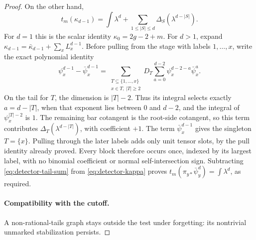\begin{proof}
On the other hand,
\begin{equation}
 t_m(\kappa_{d-1})
 =
 \int\lambda^d+
 \sum_{1\leq |S|\leq d}\Delta_S(\lambda^{d-|S|}).
 \label{eq:detector-kappa}
\end{equation}
For \(d=1\) this is the scalar identity
\(\kappa_0=2g-2+m\).
For \(d>1\), expand
\(\kappa_{d-1}=\bar\kappa_{d-1}+\sum_xL_x^{d-1}\).
Before pulling from the stage with labels \(1,\ldots,x\),
write the exact polynomial identity
\begin{equation}
 \psi_x^{d-1}-\bar\psi_x^{d-1}
 =
 \sum_{\substack{T\subseteq\{1,\ldots,x\}\\x\in T,\ |T|\geq2}}
 D_T\sum_{a=0}^{d-2}
       \psi_x^{d-2-a}\bar\psi_x^a .
 \label{eq:detector-partial-telescope}
\end{equation}
On the tail for \(T\), the dimension is \(|T|-2\).
Thus its integral selects exactly \(a=d-|T|\), when that
exponent lies between \(0\) and \(d-2\), and the integral
of \(\psi_x^{|T|-2}\) is \(1\).  The remaining bar cotangent
is the root-side cotangent, so this term contributes
\(\Delta_T(\lambda^{d-|T|})\), with coefficient \(+1\).
The term \(\bar\psi_x^{d-1}\) gives the singleton \(T=\{x\}\).
Pulling through the later labels adds only unit tensor
slots, by the pull identity already proved.  Every block
therefore occurs once, indexed by its largest label, with
no binomial coefficient or normal self-intersection sign.
Subtracting \eqref{eq:detector-tail-sum}
from \eqref{eq:detector-kappa} proves
\(t_m(\pi_{y*}\bar\psi_y^d)=\int\lambda^d\), as required.

\paragraph{Compatibility with the cutoff.}
A non-rational-tails graph stays outside the test under forgetting:
its nontrivial unmarked stabilization persists.


\end{proof}
